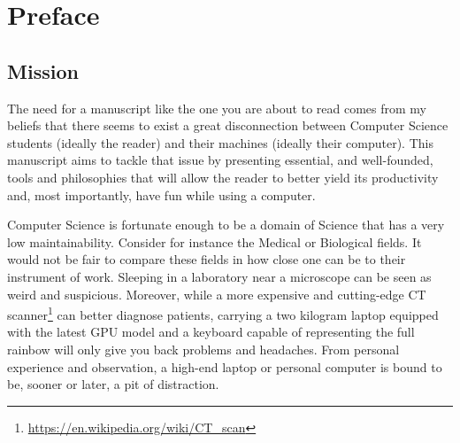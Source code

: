 \chapter{Preface}


\section{Mission}

The need for a manuscript like the one you are about to read comes
from my beliefs that there seems to exist a great disconnection
between Computer Science students (ideally the reader) and their
machines (ideally their computer). This manuscript aims to tackle that
issue by presenting essential, and well-founded, tools and
philosophies that will allow the reader to better yield
its productivity and, most importantly, have fun while using a computer.

Computer Science is fortunate enough to be a domain of Science that
has a very low maintainability. Consider for instance the Medical or
Biological fields. It would not be fair to compare these fields in how
close one can be to their instrument of work. Sleeping in a
laboratory near a microscope can be seen as weird and suspicious.
Moreover, while a more expensive and cutting-edge CT
scanner\footnote{\url{https://en.wikipedia.org/wiki/CT_scan}} can
better diagnose patients, carrying a two kilogram laptop equipped with
the latest GPU model and a keyboard capable of representing the full
rainbow will only give you back problems and headaches. From personal
experience and observation, a high-end laptop or personal computer is
bound to be, sooner or later, a pit of distraction. 

